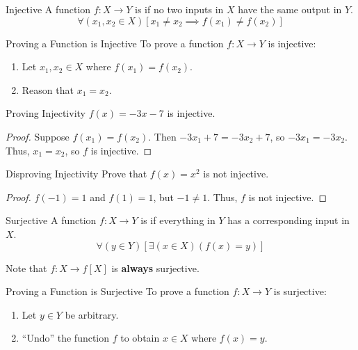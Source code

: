 \documentclass[12pt]{report}
\begin{document}
\begin{dfnbox}{Injective}{}
    A function $f : X \to Y$ is  if no two inputs in $X$ have the same output in $Y$.
    \tcblower
    \[ \forall (x_1, x_2 \in X) \left[ x_1 \neq x_2 \implies f\left(x_1\right) \neq f\left(x_2\right) \right] \]
\end{dfnbox}

\begin{tecbox}{Proving a Function is Injective}{}
    To prove a function $f : X \to Y$ is injective:
    \begin{enumerate}
        \item Let $x_1, x_2 \in X$ where $f(x_1) = f(x_2)$.
        \item Reason that $x_1 = x_2$.
    \end{enumerate}
\end{tecbox}

\begin{exbox}{Proving Injectivity}{}
    $f(x) = -3x-7$ is injective.
    \tcblower
    \begin{proof}
        Suppose $f(x_1) = f(x_2)$. Then $-3x_1+7 = -3x_2+7$, so $-3x_1 = -3x_2$. Thus, $x_1 = x_2$, so $f$ is injective.
    \end{proof}
\end{exbox}

\begin{exbox}{Disproving Injectivity}{}
    Prove that $f(x)=x^2$ is not injective.
    \tcblower
    \begin{proof}
        $f(-1) = 1$ and $f(1) = 1$, but $-1 \neq 1$. Thus, $f$ is not injective.
    \end{proof}
\end{exbox}

\begin{dfnbox}{Surjective}{}
    A function $f : X \to Y$ is  if everything in $Y$ has a corresponding input in $X$.
    \tcblower
    \[ \forall (y \in Y) \left[ \exists (x \in X) (f(x) = y) \right] \]
\end{dfnbox}

Note that $f : X \to f[X]$ is \textbf{always} surjective.

\begin{tecbox}{Proving a Function is Surjective}{}
    To prove a function $f : X \to Y$ is surjective:
    \begin{enumerate}
        \item Let $y \in Y$ be arbitrary.
        \item ``Undo'' the function $f$ to obtain $x \in X$ where $f(x)=y$.
    \end{enumerate}
\end{tecbox}
\end{document}
